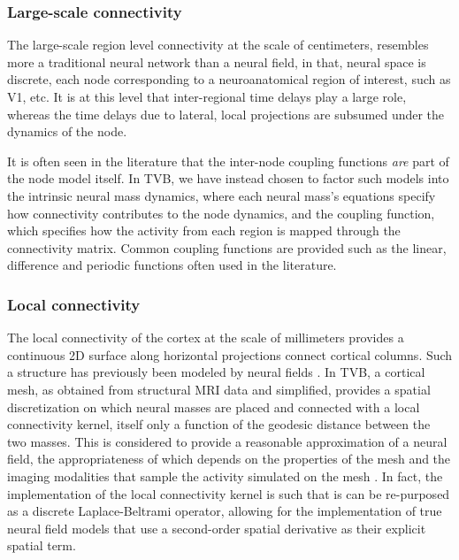 \documentclass{bioinfo}
\begin{document}
	\subsubsection{Large-scale connectivity}

	The large-scale region level connectivity at the scale of centimeters,
	resembles more a traditional neural network than a neural field, in that,
	neural space is discrete,  each node corresponding to a neuroanatomical
	region of interest, such as V1, etc. It is at this level that inter-regional 
	time delays play a large role, whereas the time delays due to 
	lateral, local projections are subsumed under the dynamics of the node.

	It is often seen in the literature that the inter-node coupling functions
	\textit{are} part of the node model itself. In TVB, we have instead 
	chosen to factor such models into the intrinsic neural mass dynamics, where each 
	neural mass's equations specify how connectivity contributes to the
	node dynamics, and the coupling function, which specifies how the activity
	from each region is mapped through the connectivity matrix. Common coupling 
	functions are provided such as the linear, difference and periodic functions
	often used in the literature.

	\subsubsection{Local connectivity}

	The local connectivity of the cortex at the scale of millimeters provides
	a continuous 2D surface along horizontal projections connect 
	cortical columns. Such a structure has previously been modeled by
	neural fields \citep{Amari_1977, Jirsa_1997, Liley_1999}. In TVB, a cortical mesh, 
	as obtained from structural MRI data and simplified, provides a spatial 
	discretization on which neural masses are placed and connected with a
	local connectivity kernel, itself only a function of the geodesic distance
	between the two masses. This is considered to provide a reasonable
	approximation of a neural field, the appropriateness of which depends on the properties
	of the mesh and the imaging modalities that sample the activity simulated
	on the mesh \citep{Spiegler_2013}. In fact,
	the implementation of the local connectivity kernel is such
	that is can be re-purposed as a discrete Laplace-Beltrami operator,
	allowing for the implementation of true neural field models that 
	use a second-order spatial derivative as their explicit spatial term.
\end{document}
